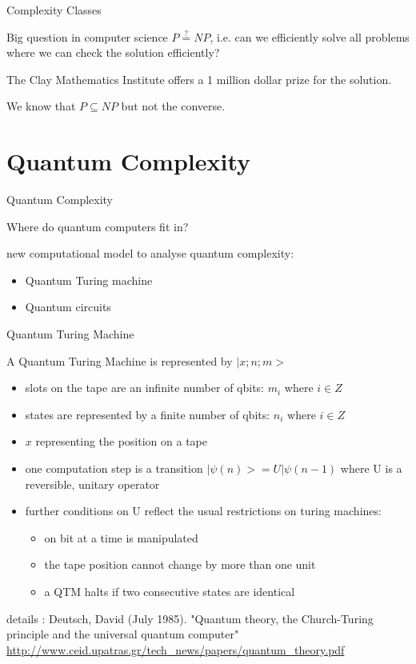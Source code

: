 \documentclass[c]{beamer}
\begin{document}
\begin{frame}{Complexity Classes}
 
 \begin{block}{Big question in computer science}
 	$P\stackrel{?}{=}NP$, i.e. can we efficiently solve all problems where we can check the solution efficiently?
 \end{block}
 The Clay Mathematics Institute offers a 1 million dollar prize for the solution.
 
 We know that $ P \subseteq NP$ but not the converse. 
\end{frame}

\section{Quantum Complexity}

\begin{frame}{Quantum Complexity}

Where do quantum computers fit in?

new computational model to analyse quantum complexity:
\begin{itemize}
\item Quantum Turing machine
\item Quantum circuits
\end{itemize}

\end{frame}

\begin{frame}{Quantum Turing Machine}

A Quantum Turing Machine is represented by $|x;n;m>$
\begin{itemize}
\item slots on the tape are an infinite number of qbits: $m_i$ where $i \in Z$ 
\item states are represented by a finite number of qbits: $n_i$ where $i \in Z$
\item $x$ representing the position on a tape
\item one computation step is a transition $|\psi(n)> = U|\psi(n-1)$ where
U is a reversible, unitary operator
\item further conditions on U reflect the usual restrictions on turing machines: 
\begin{itemize}
\item on bit at a time is manipulated
\item the tape position cannot change by more than one unit
\item a QTM halts if two consecutive states are identical
\end{itemize}
\end{itemize}

details : Deutsch, David (July 1985). "Quantum theory, the Church-Turing principle and the universal quantum computer"
\url{http://www.ceid.upatras.gr/tech_news/papers/quantum_theory.pdf}

\end{frame}
\end{document}
